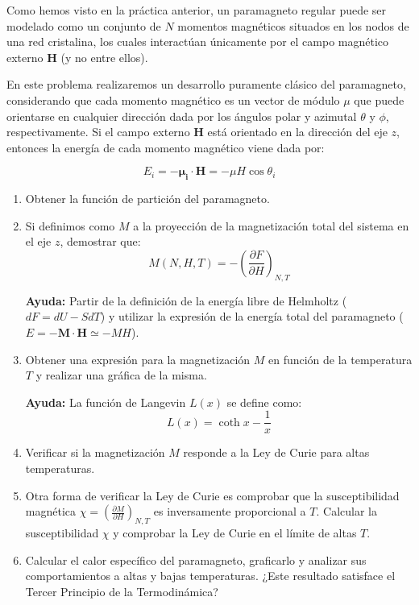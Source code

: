 \documentclass[a4paper,11pt]{article}
\begin{document}
Como hemos visto en la práctica anterior, un paramagneto regular puede ser
modelado como un conjunto de $N$ momentos magnéticos situados en los
nodos de una red cristalina, los cuales interactúan únicamente por el campo
magnético externo $\textbf{H}$ (y no entre ellos).

En este problema realizaremos un desarrollo puramente clásico del
paramagneto, considerando que cada momento magnético es un vector de
módulo $\mu$ que puede orientarse en cualquier dirección dada por los
ángulos polar y azimutal $\theta$ y $\phi$, respectivamente.
Si el campo externo $\textbf{H}$ está orientado en la dirección del eje
$z$, entonces la energía de cada momento magnético viene dada por:

$$ E_i = - \boldsymbol{\mu_i} \cdot \textbf{H} = - \mu H \cos \theta_i $$


\begin{enumerate}[label=(\alph*),
                  leftmargin=2\parindent,
                  rightmargin=2\parindent]

    \item{Obtener la función de partición del paramagneto.}

    \item{Si definimos como $M$ a la proyección de la magnetización total del
          sistema en el eje $z$, demostrar que:
          $$ M(N, H, T) = - \left( \frac{\partial F}{\partial H}
          \right)_{N, T}$$
          }

    {\small
    \textbf{Ayuda:}
    Partir de la definición de la energía libre de Helmholtz ($ dF = dU
    - S dT$) y utilizar la expresión de la energía total del
    paramagneto ($ E = - \textbf{M} \cdot \textbf{H} \simeq - MH$).
    }

    \item{Obtener una expresión para la magnetización $M$ en función
          de la temperatura $T$ y realizar una gráfica de la misma.}

    {\small
    \textbf{Ayuda:} La función de Langevin $L(x)$ se define como:
    $$ L(x) = \coth x - \frac{1}{x} $$
    }

    \item{Verificar si la magnetización $M$ responde a la Ley de Curie
          para altas temperaturas.}

    \item{Otra forma de verificar la Ley de Curie es comprobar que la
          susceptibilidad magnética
          $\chi = \left( \frac{\partial M}{\partial H}\right)_{N, T}$
          es inversamente proporcional a $T$.
          Calcular la susceptibilidad $\chi$ y comprobar la Ley de
          Curie en el límite de altas $T$.
          }

    \item{Calcular el calor específico del paramagneto, graficarlo y
          analizar sus comportamientos a altas y bajas temperaturas.
          ¿Este resultado satisface el Tercer Principio de la
          Termodinámica?}


\end{enumerate}
\end{document}
